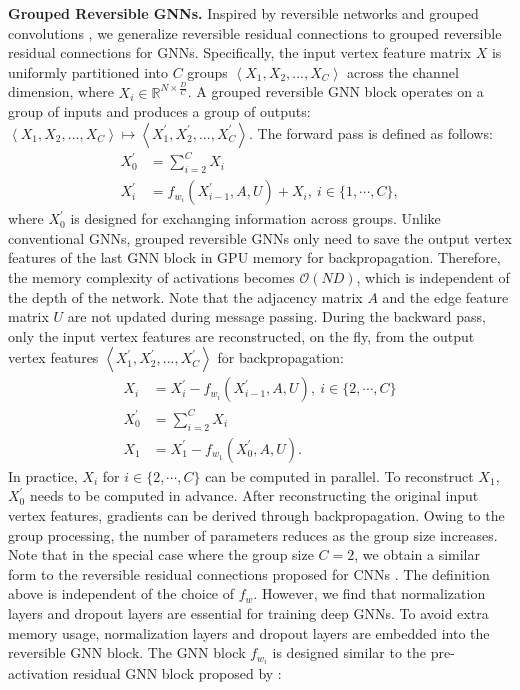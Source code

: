 \documentclass{article}
\def\Re{\mathbb{R}}
\newcommand\tuple[1]{\left\langle#1\right\rangle}
\newcommand{\mysection}[1]{\vspace{0pt}\noindent\textbf{#1.}}
\begin{document}
\mysection{Grouped Reversible GNNs} \label{grgnn}
Inspired by reversible networks \citep{gomez2017reversible,liu2019gnf, kitaev2019reformer}
and grouped convolutions \citep{krizhevsky2012imagenet, xie2017aggregated}, we generalize reversible residual connections to grouped reversible residual connections for GNNs. 
Specifically, the input vertex feature matrix $X$ is uniformly partitioned into $C$ groups
$\tuple{X_{1}, X_{2}, ..., X_{C}}$ across the channel dimension, where $X_{i} \in \Re^{N\times \frac{D}{C}}$.
A grouped reversible GNN block operates on a group of inputs and produces a group of outputs: $\tuple{X_{1}, X_{2}, ..., X_{C}} \mapsto \tuple{X_{1}^{\prime}, X_{2}^{\prime}, ..., X_{C}^{\prime}}$. The forward pass is defined as follows:
\begin{align}
X_{0}^{\prime} &= \sum_{i=2}^{C} X_{i} \\
X_{i}^{\prime} &= f_{w_i}(X_{i-1}^{\prime}, A, U) + X_{i},~ i \in \{1,\cdots,C\},
\end{align}
where $X_{0}^{\prime}$ is designed for exchanging information across groups. Unlike conventional GNNs, grouped reversible GNNs only need to save the output vertex features of the last GNN block in GPU memory for backpropagation. Therefore, the memory complexity of activations becomes $\mathcal{O}(ND)$, which is independent of the depth of the network. Note that the adjacency matrix $A$ and the edge feature matrix $U$ are not updated during message passing. During the backward pass, only the input vertex features are reconstructed, on the fly, from the output vertex features $\tuple{X_{1}^{\prime}, X_{2}^{\prime}, ..., X_{C}^{\prime}}$ for backpropagation:
\begin{align}
X_{i} &= X_{i}^{\prime} - f_{w_{i}}(X_{i-1}^{\prime}, A, U),~ i \in \{2,\cdots,C\} \\
X_{0}^{\prime} &= \sum_{i=2}^{C} X_{i} \\
X_{1} &= X_{1}^{\prime} - f_{w_{1}}(X_{0}^{\prime}, A, U).
\end{align}
In practice, $X_{i}$ for $i \in\{2,\cdots,C\}$ can be computed in parallel. To reconstruct $X_{1}$, $X_{0}^{\prime}$ needs to be computed in advance. After reconstructing the original input vertex features, gradients can be derived through backpropagation. Owing to the group processing, the number of parameters reduces as the group size increases. Note that in the special case where the group size $C=2$, we obtain a similar form to the reversible residual connections proposed for CNNs \citep{gomez2017reversible}.
The definition above is independent of the choice of $f_{w}$. However, we find that normalization layers and dropout layers are essential for training deep GNNs. To avoid extra memory usage, normalization layers and dropout layers are embedded into the reversible GNN block. The GNN block $f_{w_{i}}$ is designed similar to the pre-activation residual GNN block proposed by \citet{li2020deepergcn}:
\end{document}
